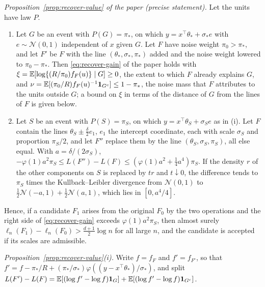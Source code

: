 \emph{Proposition~\ref{prop:recover-value} of the paper (precise statement).} Let the units have law $P$.
\begin{enumerate}[label=(\roman*),leftmargin=2.2em,itemsep=2pt]
\item Let $G$ be an event with $P(G)=\pi_\ast$, on which $y=x^{\top}\theta_\ast+\sigma_\ast e$
with $e\sim\mathcal N(0,1)$ independent of $x$ given $G$. Let $F$ have noise weight
$\pi_0>\pi_\ast$, and let $F'$ be $F$ with the line $(\theta_\ast,\sigma_\ast,\pi_\ast)$
added and the noise weight lowered to $\pi_0-\pi_\ast$. Then \eqref{eq:recover-gain} of the paper holds
with $\xi=\mathbb{E}[\log\{(R/\pi_0)f_F(u)\}\mid G]\ge0$, the extent to which $F$ already explains
$G$, and $\nu=\mathbb{E}[(\pi_0/R)f_F(u)^{-1}\mathbf{1}_{G^{c}}]\le1-\pi_\ast$, the noise mass that $F$
attributes to the units outside $G$; a bound on $\xi$ in terms of the distance of $G$ from
the lines of $F$ is given below.
\item Let $S$ be an event with $P(S)=\pi_S$, on which $y=x^{\top}\theta_S+\sigma_Se$ as in
(i). Let $F$ contain the lines $\theta_S\pm\tfrac{\delta}{2}e_1$, $e_1$ the intercept
coordinate, each with scale $\sigma_S$ and proportion $\pi_S/2$, and let $F''$ replace them
by the line $(\theta_S,\sigma_S,\pi_S)$, all else equal. With $a=\delta/(2\sigma_S)$,
$-\varphi(1)a^{2}\pi_S\le L(F'')-L(F)\le(\varphi(1)a^{2}+\tfrac14a^{4})\pi_S$. If the density
$r$ of the other components on $S$ is replaced by $tr$ and $t\downarrow0$, the difference
tends to $\pi_S$ times the Kullback--Leibler divergence from $\mathcal N(0,1)$ to
$\tfrac12\mathcal N(-a,1)+\tfrac12\mathcal N(a,1)$, which lies in $[0,a^{4}/4]$.
\end{enumerate}
Hence, if a candidate $F_1$ arises from the original $F_0$ by the two
operations and the right side of \eqref{eq:recover-gain} exceeds $\varphi(1)a^{2}\pi_S$, then
almost surely $\ell_n(F_1)-\ell_n(F_0)>\tfrac{d+1}{2}\log n$ for all large $n$, and the
candidate is accepted if its scales are admissible.

\emph{Proposition~\ref{prop:recover-value}(i).} Write $f=f_F$ and $f'=f_{F'}$, so that
$f'=f-\pi_\ast/R+(\pi_\ast/\sigma_\ast)\varphi((y-x^{\top}\theta_\ast)/\sigma_\ast)$, and
split $L(F')-L(F)=\mathbb{E}[(\log f'-\log f)\mathbf{1}_G]+\mathbb{E}[(\log f'-\log f)\mathbf{1}_{G^{c}}]$.

